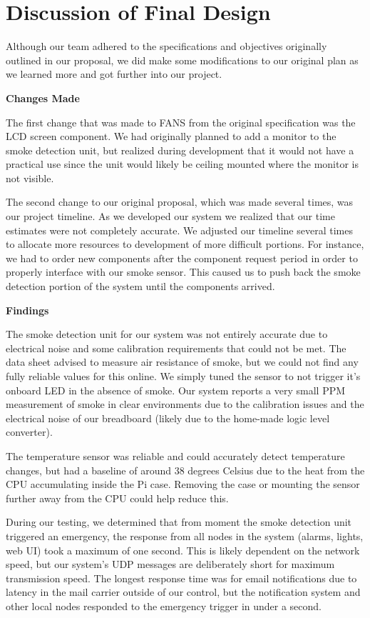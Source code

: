 \section{Discussion of Final Design}

Although our team adhered to the specifications and objectives originally outlined in our proposal, we did make some
modifications to our original plan as we learned more and got further into our project.

\textbf{Changes Made}

The first change that was made to FANS from the original specification was the LCD screen component. We had originally
planned to add a monitor to the smoke detection unit, but realized during development that it would not have a
practical use since the unit would likely be ceiling mounted where the monitor is not visible.

The second change to our original proposal, which was made several times, was our project timeline. As we developed our
system we realized that our time estimates were not completely accurate. We adjusted our timeline several times to
allocate more resources to development of more difficult portions. For instance, we had to order new components after
the component request period in order to properly interface with our smoke sensor. This caused us to push back the
smoke detection portion of the system until the components arrived.

\textbf{Findings}

The smoke detection unit for our system was not entirely accurate due to electrical noise and some calibration
requirements that could not be met. The data sheet advised to measure air resistance of smoke, but we could not find
any fully reliable values for this online. We simply tuned the sensor to not trigger it's onboard LED in the absence of
smoke. Our system reports a very small PPM measurement of smoke in clear environments due to the calibration issues and
the electrical noise of our breadboard (likely due to the home-made logic level converter).

The temperature sensor was reliable and could accurately detect temperature changes, but had a baseline of around 38
degrees Celsius due to the heat from the CPU accumulating inside the Pi case. Removing the case or mounting the sensor
further away from the CPU could help reduce this.

During our testing, we determined that from moment the smoke detection unit triggered an emergency, the response from
all nodes in the system (alarms, lights, web UI) took a maximum of one second. This is likely dependent on the network
speed, but our system's UDP messages are deliberately short for maximum transmission speed. The longest response time
was for email notifications due to latency in the mail carrier outside of our control, but the notification system and
other local nodes responded to the emergency trigger in under a second.

